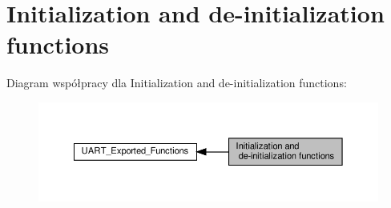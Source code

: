 \hypertarget{group___u_a_r_t___exported___functions___group1}{}\section{Initialization and de-\/initialization functions}
\label{group___u_a_r_t___exported___functions___group1}
Diagram współpracy dla Initialization and de-\/initialization functions\+:\nopagebreak
\begin{figure}[H]
\begin{center}
\leavevmode
\includegraphics[width=350pt]{group___u_a_r_t___exported___functions___group1}
\end{center}
\end{figure}
